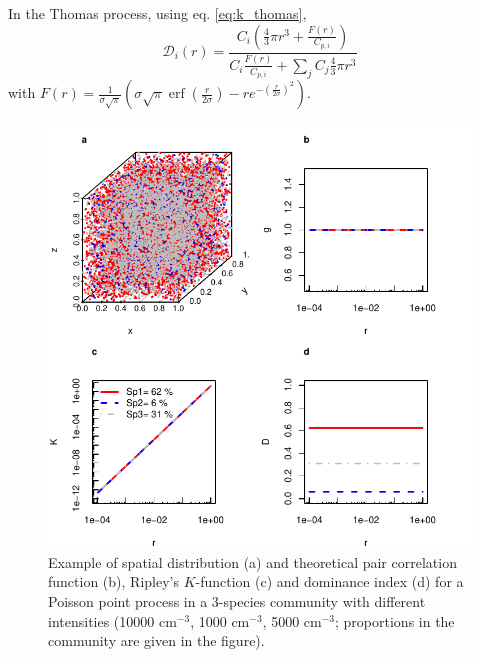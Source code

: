 \documentclass[english]{article}
\DeclareMathOperator\erf{erf}
\begin{document}
In the Thomas process, using eq. \ref{eq:k_thomas},
\begin{equation}
\mathcal{D}_{i}(r)=\frac{C_{i}\left(\frac{4}{3}\pi r^{3}+\frac{F(r)}{C_{p,i}}\right)}{C_{i}\frac{F(r)}{C_{p,i}}+\sum_{j}C_{j}\frac{4}{3}\pi r^{3}}
\end{equation}
with $F(r)=\frac{1}{\sigma\sqrt{\pi}}\left(\sigma\sqrt{\pi}\erf\left(\frac{r}{2\sigma}\right)-re^{-\left(\frac{r}{2\sigma}\right)^{2}}\right)$.

\begin{figure}[H]
\begin{centering}
\includegraphics[width=1\textwidth]{../code/figure/example_Poisson_distribution}
\par\end{centering}
\caption{Example of spatial distribution (a) and theoretical pair correlation
function (b), Ripley's $K$-function (c) and dominance index (d) for
a Poisson point process in a 3-species community with different intensities
(10000 cm$^{-3}$, 1000 cm$^{-3}$, 5000 cm$^{-3}$; proportions in
the community are given in the figure). \label{fig:Example-Poisson}}
\end{figure}
\end{document}
